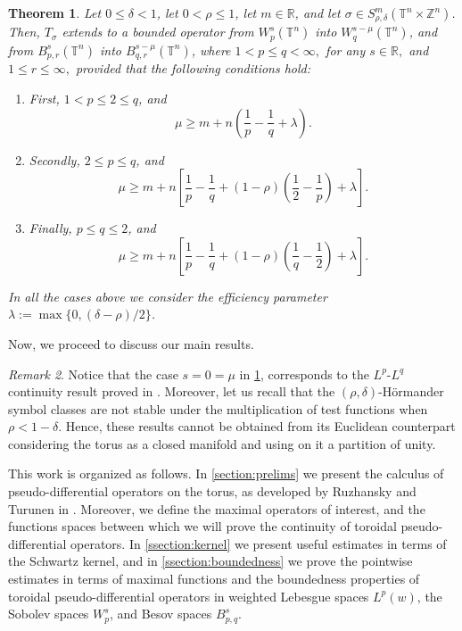 \documentclass[12pt, reqno]{amsart}
\newtheorem{theorem}{Theorem}[section]
\theoremstyle{definition}
\theoremstyle{remark}
\newtheorem{remark}[theorem]{Remark}
\numberwithin{equation}{section}
\begin{document}
\begin{theorem}
    Let $0\leq\delta<1$, let $0<\rho\leq 1$, let $m\in\mathbb{R}$, and let $\sigma\in S^m_{\rho,\delta}(\mathbb{T}^n\times\mathbb{Z}^n)$. Then, $T_\sigma$ extends to a bounded operator from $W^{s}_p(\mathbb{T}^n)$ into $W^{s-\mu}_q(\mathbb{T}^n)$, and from $B^s_{p,r}(\mathbb{T}^n)$ into $B^{s-\mu}_{q,r}(\mathbb{T}^n)$, where $1<p\leq q<\infty,$ for any $s\in\mathbb{R},$ and $1\leq r\leq \infty,$ provided that the following conditions hold:
    \begin{enumerate}
        \item First,  $1<p\leq 2 \leq q$, and 
        \begin{equation*}
            \mu \geq m + n \left( \frac{1}{p} - \frac{1}{q} + \lambda
            \right).
        \end{equation*}
        \item Secondly, $2 \leq p \leq q$, and 
        \begin{equation*}
            \mu \geq m + n \left[ \frac{1}{p} - \frac{1}{q} + (1-\rho) \left( \frac{1}{2} - \frac{1}{p}
            \right)
            + \lambda
            \right].
        \end{equation*}
        \item Finally,  $p\leq q \leq 2$, and 
        \begin{equation*}
            \mu \geq m + n \left[ \frac{1}{p} - \frac{1}{q} + (1-\rho) \left( \frac{1}{q} - \frac{1}{2}
            \right)
            + \lambda
            \right].
        \end{equation*}
    \end{enumerate}
     In all the cases above we consider the efficiency parameter $\lambda := \max\{ 0, (\delta-\rho)/2 \}$. 
     \label{theo:main2}
\end{theorem}
Now, we proceed to discuss our main results.
\begin{remark}
    Notice that the case $s=0=\mu$ in \cref{theo:main2}, corresponds to the $L^p$-$L^q$ continuity result proved in \cite{Cardona:Martinez}. Moreover, let us recall that the $(\rho, \delta)$-H\"ormander symbol classes are not stable under the multiplication of test functions when $\rho < 1 - \delta$. Hence, these results cannot be obtained from its Euclidean counterpart considering the torus as a closed manifold and using on it a partition of unity.
\end{remark}
This work is organized as follows. In \cref{section:prelims} we present the calculus of pseudo-differential operators on the torus, as developed by Ruzhansky and Turunen in \cite{ruzhansky-turunen}. Moreover, we define the maximal operators of interest, and the functions spaces between which we will prove the continuity of toroidal pseudo-differential operators. In \cref{ssection:kernel} we present useful estimates in terms of the Schwartz kernel, and in \cref{ssection:boundedness} we prove the pointwise estimates in terms of maximal functions and the boundedness properties of toroidal pseudo-differential operators in weighted Lebesgue spaces $L^p(w)$, the Sobolev spaces $W^s_p$, and Besov spaces $B^s_{p,q}$.
\end{document}
